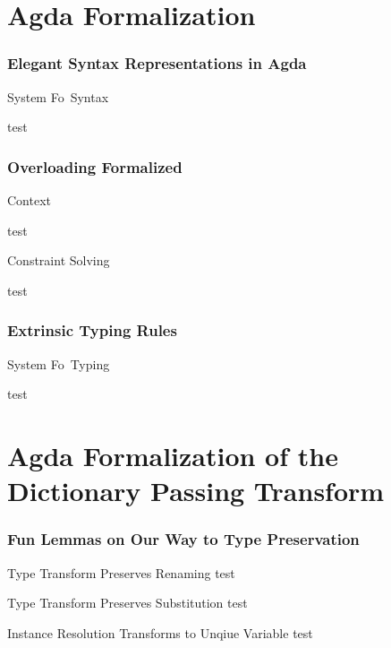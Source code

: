\documentclass[aspectratio=169]{beamer}
\begin{document}
\section{Agda Formalization}

\begin{frame}[fragile]
  \frametitle{Elegant Syntax Representations in Agda}
  \begin{block}{System Fo\ Syntax}
    \begin{small}
test
    \end{small}
  \end{block}
\end{frame}

\begin{frame}[fragile]
  \frametitle{Overloading Formalized}
  \begin{block}{Context}
    \begin{small}
test
    \end{small}
  \end{block}
  \begin{block}{Constraint Solving}
    \begin{small}
test
    \end{small}
  \end{block}
\end{frame}

\begin{frame}[fragile]
  \frametitle{Extrinsic Typing Rules}
  \begin{block}{System Fo\ Typing}
    \begin{small}
test
    \end{small}
  \end{block}
\end{frame}

\section{Agda Formalization of the Dictionary Passing Transform}
\begin{frame}[fragile]
  \frametitle{Fun Lemmas on Our Way to Type Preservation}
  \begin{block}{Type Transform Preserves Renaming}
test
  \end{block}
  \begin{block}{Type Transform Preserves Substitution}
test
  \end{block}
  \begin{block}{Instance Resolution Transforms to Unqiue Variable}
test
  \end{block}
\end{frame}
\end{document}
